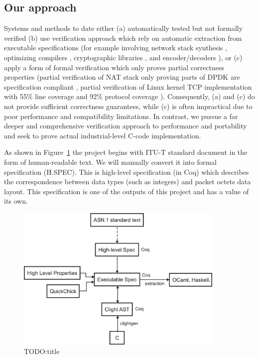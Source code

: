 \documentclass[acmsmall,nonacm]{acmart}
\begin{document}
\subsection{Our approach}

Systems and methods to date either (a) automatically tested but not
formally verified (b) use verification approach which rely on
automatic extraction from executable specifications (for example
involving network stack synthesis \cite{VNSSforSel4}, optimizing compilers
\cite{CompCert}, cryptographic libraries \cite{HACL}, and
encoder/decoders \cite{Narcissus}), or (c) apply a form of formal
verification which only proves partial correctness properties (partial
verification of NAT stack only proving parts of DPDK are specification
compliant \cite{NAT}, partial verification of Linux kernel TCP
implementation with 55\% line coverage and 92\% protocol coverage
\cite{NSDI}). Consequently, (a) and (c) do not provide sufficient
correctness guarantees, while (c) is often impractical due to poor
performance and compatibility limitations. In contrast, we pursue a
far deeper and comprehensive verification approach to performance and
portability and seek to prove actual industrial-level C-code
implementation.

As shown in Figure~\ref{fig:components} the project begins with ITU-T
standard document in the form of human-readable text. We will manually
convert it into formal specification (H.SPEC). This is high-level
specification (in Coq) which describes the correspondence between data
types (such as integers) and packet octets data layout. This
specification is one of the outputs of this project and has a value of
its own.

\begin{figure}[h!]
  \centering
  \includegraphics[width=10cm]{VerificationArchitectureDiagram.png}
  \caption{TODO:title}
  \label{fig:components}
\end{figure}
\end{document}
